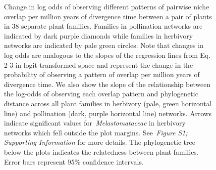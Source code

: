 \documentclass[12pt]{article}
\begin{document}
  \begin{figure}[!h]
    \begin{center}
    \end{center}
     \caption{Change in log odds of observing different 
     patterns of pairwise niche overlap per million
     years of divergence time between a pair of plants
     in 38 separate plant families.
     Families in pollination networks are indicated
     by dark purple diamonds while families in herbivory
     networks are indicated by pale green circles.
     Note that changes in log odds are analogous to the 
     slopes of the regression lines from Eq. 2-3
     in logit-transformed space and represent
     the change in the probability of observing a pattern
     of overlap per million years of divergence time. We also
     show the slope of the relationship between the
     log-odds of observing each overlap pattern and 
     phylogenetic distance across all plant families
     in herbivory (pale, green horizontal line) and
     pollination (dark, purple horizontal line) networks.
     Arrows indicate significant values for~\emph{Melastomataceae} in
     herbivory networks which fell outside the plot margins.
     See~\emph{Figure S1; Supporting Information} for more details.
     The phylogenetic tree below the plots indicates the
     relatedness between plant families. Error bars represent 95\% confidence
     intervals.}
    \label{within_family_regression}
  \end{figure}
\end{document}
